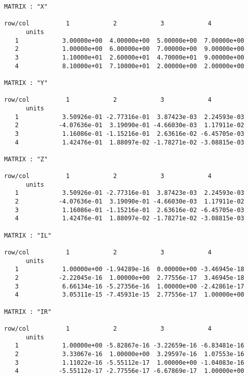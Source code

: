 \begin{footnotesize}
\begin{verbatim}
MATRIX : "X"

row/col          1            2            3            4          
      units                                           
   1            3.00000e+00  4.00000e+00  5.00000e+00  7.00000e+00
   2            1.00000e+00  6.00000e+00  7.00000e+00  9.00000e+00
   3            1.10000e+01  2.60000e+01  4.70000e+01  9.00000e+00
   4            8.10000e+01  7.10000e+01  2.00000e+00  2.00000e+00

MATRIX : "Y"

row/col          1            2            3            4          
      units                                           
   1            3.50926e-01 -2.77316e-01  3.87423e-03  2.24593e-03
   2           -4.07636e-01  3.19090e-01 -4.66030e-03  1.17911e-02
   3            1.16086e-01 -1.15216e-01  2.63616e-02 -6.45705e-03
   4            1.42476e-01  1.88097e-02 -1.78271e-02 -3.08815e-03

MATRIX : "Z"

row/col          1            2            3            4          
      units                                           
   1            3.50926e-01 -2.77316e-01  3.87423e-03  2.24593e-03
   2           -4.07636e-01  3.19090e-01 -4.66030e-03  1.17911e-02
   3            1.16086e-01 -1.15216e-01  2.63616e-02 -6.45705e-03
   4            1.42476e-01  1.88097e-02 -1.78271e-02 -3.08815e-03

MATRIX : "IL"

row/col          1            2            3            4          
      units                                           
   1            1.00000e+00 -1.94289e-16  0.00000e+00 -3.46945e-18
   2           -2.22045e-16  1.00000e+00  2.77556e-17  3.46945e-18
   3            6.66134e-16 -5.27356e-16  1.00000e+00 -2.42861e-17
   4            3.05311e-15 -7.45931e-15  2.77556e-17  1.00000e+00

MATRIX : "IR"

row/col          1            2            3            4          
      units                                           
   1            1.00000e+00 -5.82867e-16 -3.22659e-16 -6.83481e-16
   2            3.33067e-16  1.00000e+00  3.29597e-16  1.07553e-16
   3            1.11022e-16 -5.55112e-17  1.00000e+00 -1.04083e-16
   4           -5.55112e-17 -2.77556e-17 -6.67869e-17  1.00000e+00
\end{verbatim}
\end{footnotesize}

